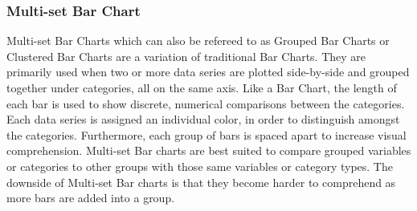 \subsubsection{Multi-set Bar Chart}
Multi-set Bar Charts which can also be refereed to as Grouped Bar Charts or Clustered 
Bar Charts are a variation of traditional Bar Charts. They are primarily used when 
two or more data series are plotted side-by-side and grouped together under categories, 
all on the same axis. Like a Bar Chart, the length of each bar is used to show 
discrete, numerical comparisons between the categories. Each data series is assigned 
an individual color, in order to distinguish amongst the categories. Furthermore, 
each group of bars is spaced apart to increase visual comprehension. Multi-set 
Bar charts are best suited to compare grouped variables or categories to other 
groups with those same variables or category types. The downside of Multi-set Bar 
charts is that they become harder to comprehend as more bars are added into a 
group.
